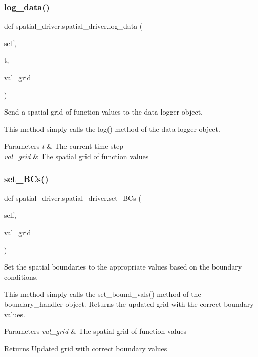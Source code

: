 \subsubsection{\texorpdfstring{log\+\_\+data()}{log\_data()}}
{\footnotesize\ttfamily def spatial\+\_\+driver.\+spatial\+\_\+driver.\+log\+\_\+data (\begin{DoxyParamCaption}\item[{}]{self,  }\item[{}]{t,  }\item[{}]{val\+\_\+grid }\end{DoxyParamCaption})}



Send a spatial grid of function values to the data logger object. 

This method simply calls the log() method of the data logger object. 
\begin{DoxyParams}{Parameters}
{\em t} & The current time step \\
\hline
{\em val\+\_\+grid} & The spatial grid of function values \\
\hline
\end{DoxyParams}
\mbox{\label{classspatial__driver_1_1spatial__driver_a9e108d8aae84dbbfdbd522ef47e8f559}} 
\subsubsection{\texorpdfstring{set\+\_\+\+B\+Cs()}{set\_BCs()}}
{\footnotesize\ttfamily def spatial\+\_\+driver.\+spatial\+\_\+driver.\+set\+\_\+\+B\+Cs (\begin{DoxyParamCaption}\item[{}]{self,  }\item[{}]{val\+\_\+grid }\end{DoxyParamCaption})}



Set the spatial boundaries to the appropriate values based on the boundary conditions. 

This method simply calls the set\+\_\+bound\+\_\+vals() method of the boundary\+\_\+handler object. Returns the updated grid with the correct boundary values. 
\begin{DoxyParams}{Parameters}
{\em val\+\_\+grid} & The spatial grid of function values \\
\hline
\end{DoxyParams}
\begin{DoxyReturn}{Returns}
Updated grid with correct boundary values 
\end{DoxyReturn}
\mbox{\label{classspatial__driver_1_1spatial__driver_a379238cfd02adf2ae124015e1108182d}} 
